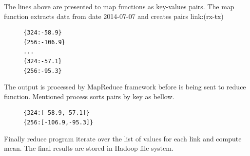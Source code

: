 \documentclass[a4paper,12pt,oneside]{report}
\begin{document}
The lines above are presented to map functions as key-values pairs.
The map function extracts data from date 2014-07-07 and creates pairs {link:(rx-tx)}

\begin{figure}[h!]
\begin{footnotesize}
\lstset{extendedchars=false,
escapeinside=''}
\begin{lstlisting}[style=mybash]
{324:-58.9}
{256:-106.9}
...
{324:-57.1}
{256:-95.3}
\end{lstlisting}
\end{footnotesize} 
\end{figure}
The output is processed by MapReduce framework before is being sent to reduce function.
 Mentioned process sorts pairs by key as bellow.
\begin{figure}[h!]
\begin{footnotesize}
\lstset{extendedchars=false,
escapeinside=''}
\begin{lstlisting}[style=mybash]
{324:[-58.9,-57.1]}
{256:[-106.9,-95.3]}
\end{lstlisting}
\end{footnotesize} 
\end{figure}
Finally reduce program iterate over the list of values for each link and compute mean.
 The final results are stored in Hadoop file system.
\end{document}
